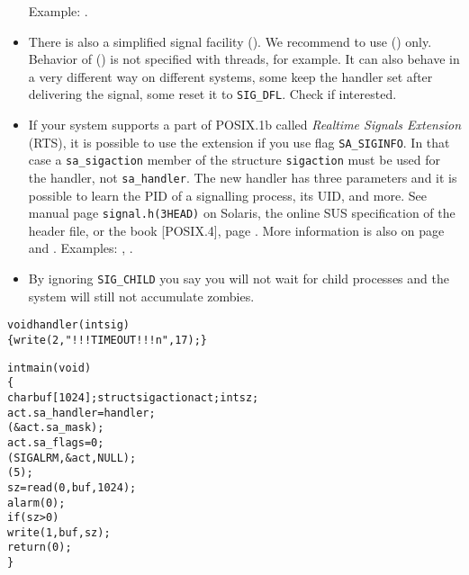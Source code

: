 \begin{itemize}
Example: .
\item There is also a simplified signal facility ().  We recommend
to use () only.  Behavior of () is not specified
with threads, for example.  It can also behave in a very different way on
different systems, some keep the handler set after delivering the signal, some
reset it to \texttt{SIG\_DFL}.  Check  if
interested.
\item \label{REALTIMEEXTENSIONS} If your system supports a part of POSIX.1b
called \emph{Realtime Signals Extension} (RTS), it is possible to use the
extension if you use flag \texttt{SA\_SIGINFO}.  In that case a
\texttt{sa\_sigaction} member of the structure \texttt{sigaction} must be used
for the handler, not \texttt{sa\_handler}.  The new handler has three parameters
and it is possible to learn the PID of a signalling process, its UID, and more.
See manual page \texttt{signal.h(3HEAD)} on Solaris, the online SUS
specification of the header file, or the book [POSIX.4], page
\pageref{REF_PROGRAMMING}.  More information is also on page \pageref{POSIX} and
\pageref{SIGWAITINFO}.  Examples: ,
.
\item \label{IGNORE_SIG_CHLD} By ignoring \texttt{SIG\_CHILD} you say you will
not wait for child processes and the system will still not accumulate zombies.
\end{itemize}


\begin{slide}
\setlength{\baselineskip}{0.8\baselineskip}
\begin{alltt}
void handler(int sig)
\{ write(2," !!! TIMEOUT !!! \bs{}n", 17); \}

int main(void)
\{
    char buf[1024]; struct sigaction act; int sz;
    act.sa\_handler = handler;
    (&act.sa\_mask);
    act.sa\_flags = 0;
    (SIGALRM, &act, NULL);
    (5);
    sz = read(0, buf, 1024);
    alarm(0);
    if (sz > 0)
        write(1, buf, sz);
    return (0);
\}
\end{alltt}
\end{slide}

\label{SIGALRM}


